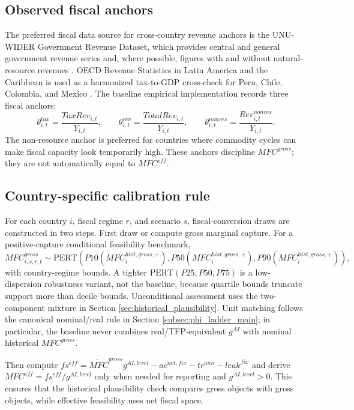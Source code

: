 \documentclass[11pt,a4paper]{article}
\begin{document}
\subsection{Observed fiscal anchors}

The preferred fiscal data source for cross-country revenue anchors is the UNU-WIDER Government Revenue Dataset, which provides central and general government revenue series and, where possible, figures with and without natural-resource revenues \citep{unu2025grd}. OECD Revenue Statistics in Latin America and the Caribbean is used as a harmonized tax-to-GDP cross-check for Peru, Chile, Colombia, and Mexico \citep{oecd2025revenue}. The baseline empirical implementation records three fiscal anchors:
\begin{equation}
    \theta^{tax}_{i,t}=\frac{TaxRev_{i,t}}{Y_{i,t}},\qquad
    \theta^{rev}_{i,t}=\frac{TotalRev_{i,t}}{Y_{i,t}},\qquad
    \theta^{nonres}_{i,t}=\frac{Rev^{nonres}_{i,t}}{Y_{i,t}}.
\end{equation}
The non-resource anchor is preferred for countries where commodity cycles can make fiscal capacity look temporarily high. These anchors discipline $MFC^{gross}$; they are not automatically equal to $MFC^{eff}$.

\subsection{Country-specific calibration rule}

For each country $i$, fiscal regime $r$, and scenario $s$, fiscal-conversion draws are constructed in two steps. First draw or compute gross marginal capture. For a positive-capture conditional feasibility benchmark,
\begin{equation}
    MFC^{gross}_{i,s,r,t}
    \sim \text{PERT}\left(P10(MFC^{hist,gross,+}_i),P50(MFC^{hist,gross,+}_i),P90(MFC^{hist,gross,+}_i)\right),
\end{equation}
with country-regime bounds. A tighter $\text{PERT}(P25,P50,P75)$ is a low-dispersion robustness variant, not the baseline, because quartile bounds truncate support more than decile bounds. Unconditional assessment uses the two-component mixture in Section \ref{sec:historical_plausibility}. Unit matching follows the canonical nominal/real rule in Section \ref{subsec:phi_ladder_main}; in particular, the baseline never combines real/TFP-equivalent $g^{AI}$ with nominal historical $MFC^{gross}$.

Then compute $fs^{eff}=\widetilde{MFC}^{gross}g^{AI,level}-ac^{net,fix}-tr^{ann}-leak^{fix}$ and derive $MFC^{eff}=fs^{eff}/g^{AI,level}$ only when needed for reporting and $g^{AI,level}>0$. This ensures that the historical plausibility check compares gross objects with gross objects, while effective feasibility uses net fiscal space.
\end{document}
